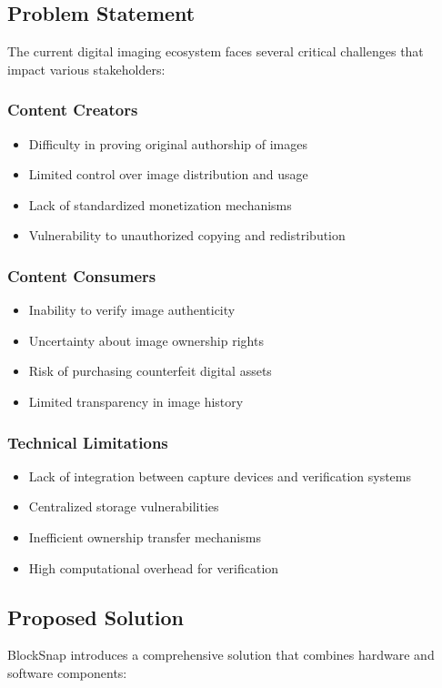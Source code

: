 \documentclass[conference]{IEEEtran}
\begin{document}
\subsection{Problem Statement}
The current digital imaging ecosystem faces several critical challenges that impact various stakeholders:

\subsubsection{Content Creators}
\begin{itemize}
    \item Difficulty in proving original authorship of images
    \item Limited control over image distribution and usage
    \item Lack of standardized monetization mechanisms
    \item Vulnerability to unauthorized copying and redistribution
\end{itemize}

\subsubsection{Content Consumers}
\begin{itemize}
    \item Inability to verify image authenticity
    \item Uncertainty about image ownership rights
    \item Risk of purchasing counterfeit digital assets
    \item Limited transparency in image history
\end{itemize}

\subsubsection{Technical Limitations}
\begin{itemize}
    \item Lack of integration between capture devices and verification systems
    \item Centralized storage vulnerabilities
    \item Inefficient ownership transfer mechanisms
    \item High computational overhead for verification
\end{itemize}

\subsection{Proposed Solution}
BlockSnap introduces a comprehensive solution that combines hardware and software components:
\end{document}
